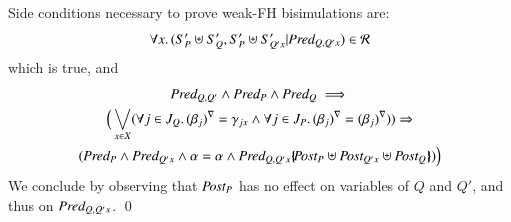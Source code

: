 \documentclass{elsarticle}
\begin{document}
Side conditions necessary to prove weak-FH bisimulations are:
\[\forall x.\, (S'_P\uplus S'_Q,S'_P\uplus S'_{Q' x}| \Pred_{Q,Q' x})\in\mathcal{R}\]
which is true, and
\begin{multline*}
\Pred_{Q,Q'}\land \Pred_P\land \Pred_Q \implies \\
\Big(\bigvee_{x\in X}
(\forall j\in J_Q.\, \vis{\beta_j}=\gamma_{j x}\land \forall j\in J_P.\, \vis{\beta_j}=\vis{\beta_j}))\Rightarrow \\(\Pred_P\land \Pred_{Q' x}\land \alpha=\alpha \land \Pred_{Q,Q' x}\subst{\Post_P\uplus\Post_{Q' x}\uplus \Post_{Q}}) \Big)
\end{multline*}
We conclude by observing that $\Post_P$ has no effect on variables of $Q$ and $Q'$, and thus on $\Pred_{Q,Q' x}$.
\qed
%
%
%
%
%
%
%
%
\end{document}
